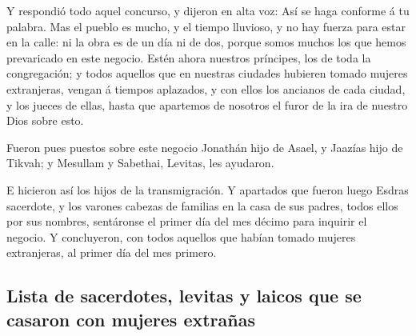  Y respondió todo aquel concurso, y dijeron en alta voz:
Así se haga conforme á tu palabra.  Mas el pueblo es mucho,
y el tiempo lluvioso, y no hay fuerza para estar en la calle: ni la obra
es de un día ni de dos, porque somos muchos los que hemos prevaricado en
este negocio.  Estén ahora nuestros príncipes, los de toda
la congregación; y todos aquellos que en nuestras ciudades hubieren
tomado mujeres extranjeras, vengan á tiempos aplazados, y con ellos los
ancianos de cada ciudad, y los jueces de ellas, hasta que apartemos de
nosotros el furor de la ira de nuestro Dios sobre esto.

 Fueron pues puestos sobre este negocio Jonathán hijo de
Asael, y Jaazías hijo de Tikvah; y Mesullam y Sabethai, Levitas, les
ayudaron.

 E hicieron así los hijos de la transmigración. Y apartados
que fueron luego Esdras sacerdote, y los varones cabezas de familias en
la casa de sus padres, todos ellos por sus nombres, sentáronse el primer
día del mes décimo para inquirir el negocio.  Y
concluyeron, con todos aquellos que habían tomado mujeres extranjeras,
al primer día del mes primero.

\hypertarget{lista-de-sacerdotes-levitas-y-laicos-que-se-casaron-con-mujeres-extrauxf1as}{%
\subsection{Lista de sacerdotes, levitas y laicos que se casaron con
mujeres
extrañas}\label{lista-de-sacerdotes-levitas-y-laicos-que-se-casaron-con-mujeres-extrauxf1as}}

